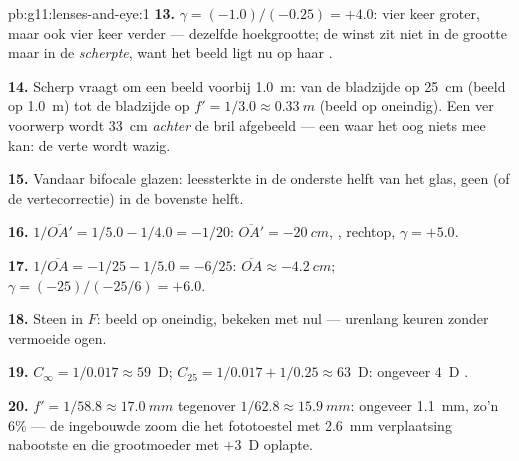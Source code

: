 \begin{solution}{pb:g11:lenses-and-eye:1}
\textbf{13.} $\gamma = (-1.0)/(-0.25) = +4.0$: vier keer groter, maar
ook vier keer verder --- dezelfde hoekgrootte; de winst zit niet in de
grootte maar in de \emph{scherpte}, want het beeld ligt nu op haar
.

\textbf{14.} Scherp vraagt om een beeld voorbij \qty{1.0}{m}: van de
bladzijde op \qty{25}{cm} (beeld op \qty{1.0}{m}) tot de bladzijde op
$f' = 1/3.0 \approx \qty{0.33}{m}$ (beeld op oneindig). Een ver voorwerp
wordt \qty{33}{cm} \emph{achter} de bril afgebeeld --- een 
waar het oog niets mee kan: de verte wordt wazig.

\textbf{15.} Vandaar bifocale glazen: leessterkte in de onderste helft
van het glas, geen (of de vertecorrectie) in de bovenste helft.

\textbf{16.} $1/\overline{OA'} = 1/5.0 - 1/4.0 = -1/20$:
$\overline{OA'} = \qty{-20}{cm}$, , rechtop, $\gamma = +5.0$.

\textbf{17.} $1/\overline{OA} = -1/25 - 1/5.0 = -6/25$:
$\overline{OA} \approx \qty{-4.2}{cm}$; $\gamma = (-25)/(-25/6) = +6.0$.

\textbf{18.} Steen in $F$: beeld op oneindig, bekeken met nul
 --- urenlang keuren zonder vermoeide ogen.

\textbf{19.} $C_\infty = 1/0.017 \approx 59$~D;
$C_{25} = 1/0.017 + 1/0.25 \approx 63$~D: ongeveer $4$~D .

\textbf{20.} $f' = 1/58.8 \approx \qty{17.0}{mm}$ tegenover
$1/62.8 \approx \qty{15.9}{mm}$: ongeveer \qty{1.1}{mm}, zo'n $6\%$ ---
de ingebouwde zoom die het fototoestel met \qty{2.6}{mm} verplaatsing
nabootste en die grootmoeder met $+3$~D oplapte.
\end{solution}
